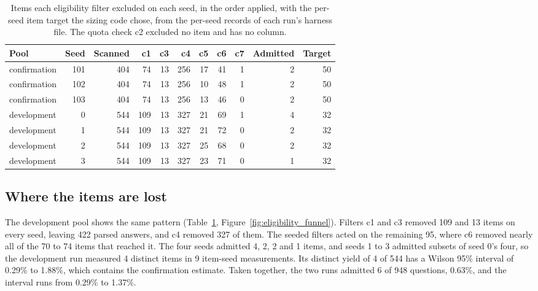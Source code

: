 \documentclass[11pt]{article}
\begin{document}
\begin{table}[t]
\centering
\small
\setlength{\tabcolsep}{4pt}
\begin{tabular}{lrrrrrrrrrr}
\toprule
Pool & Seed & Scanned & c1 & c3 & c4 & c5 & c6 & c7 & Admitted & Target \\
\midrule
confirmation & 101 & 404 & 74 & 13 & 256 & 17 & 41 & 1 & 2 & 50 \\
confirmation & 102 & 404 & 74 & 13 & 256 & 10 & 48 & 1 & 2 & 50 \\
confirmation & 103 & 404 & 74 & 13 & 256 & 13 & 46 & 0 & 2 & 50 \\
development & 0 & 544 & 109 & 13 & 327 & 21 & 69 & 1 & 4 & 32 \\
development & 1 & 544 & 109 & 13 & 327 & 21 & 72 & 0 & 2 & 32 \\
development & 2 & 544 & 109 & 13 & 327 & 25 & 68 & 0 & 2 & 32 \\
development & 3 & 544 & 109 & 13 & 327 & 23 & 71 & 0 & 1 & 32 \\
\bottomrule
\end{tabular}
\caption{Items each eligibility filter excluded on each seed, in the order applied, with the per-seed item target the sizing code chose, from the per-seed records of each run's harness file. The quota check c2 excluded no item and has no column.}
\label{tab:t1}
\end{table}


\subsection{Where the items are lost}\label{where-the-items-are-lost}

The development pool shows the same pattern (Table~\ref{tab:t1}, Figure~\ref{fig:eligibility_funnel}). Filters c1 and c3 removed 109 and 13 items on every seed, leaving 422 parsed answers, and c4 removed 327 of them. The seeded filters acted on the remaining 95, where c6 removed nearly all of the 70 to 74 items that reached it. The four seeds admitted 4, 2, 2 and 1 items, and seeds 1 to 3 admitted subsets of seed 0's four, so the development run measured 4 distinct items in 9 item-seed measurements. Its distinct yield of 4 of 544 has a Wilson 95\% interval of 0.29\% to 1.88\%, which contains the confirmation estimate. Taken together, the two runs admitted 6 of 948 questions, 0.63\%, and the interval runs from 0.29\% to 1.37\%.
\end{document}
